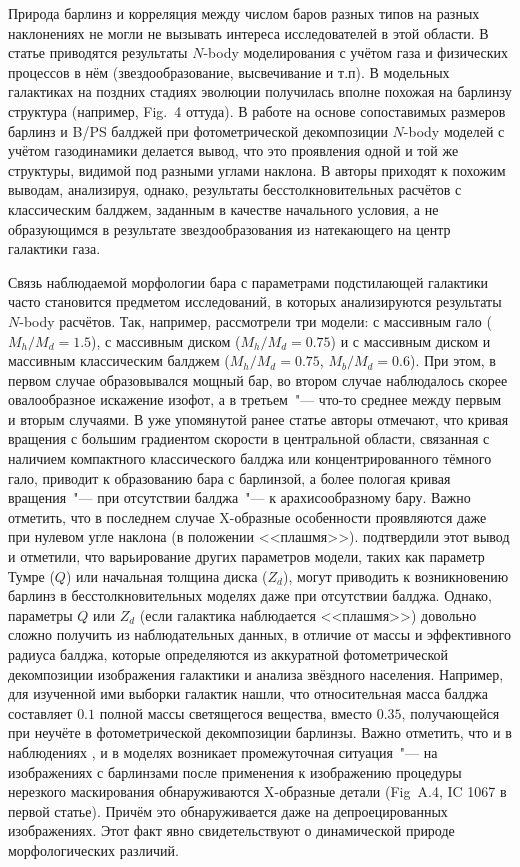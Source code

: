 \documentclass{trlnotes}
\begin{document}
Природа барлинз и корреляция между числом баров разных типов на разных наклонениях не могли не вызывать интереса исследователей в этой области.  В статье \citet{athanassoula2013a} приводятся результаты $N$-body моделирования с учётом газа и физических процессов в нём (звездообразование, высвечивание и т.п). В модельных галактиках на поздних стадиях эволюции  получилась вполне похожая на барлинзу структура (например, Fig.~4 оттуда). В работе  \citet{athanassoula2015} на основе сопоставимых размеров барлинз и B/PS балджей при фотометрической декомпозиции $N$-body моделей с учётом газодинамики делается вывод, что это проявления одной и той же структуры, видимой под разными углами наклона. В \citet{salo2017} авторы приходят к похожим выводам, анализируя, однако, результаты бесстолкновительных расчётов с классическим балджем, заданным в качестве начального условия, а не образующимся в результате звездообразования из  натекающего на центр галактики газа. 

Связь наблюдаемой морфологии бара с параметрами подстилающей галактики часто становится предметом исследований, в которых анализируются результаты $N$-body расчётов. Так, например, \citet{athanassoula2002} рассмотрели три модели: с массивным гало ($M_h/M_d = 1.5$), с массивным диском ($M_h/M_d = 0.75$) и с массивным диском и массивным классическим балджем ($M_h/M_d = 0.75$, $M_b/M_d = 0.6$). При этом, в первом случае образовывался мощный  бар, во втором случае наблюдалось скорее овалообразное искажение изофот, а в третьем~"--- что-то среднее между первым и вторым случаями. В уже упомянутой ранее статье \citet{salo2017} авторы отмечают, что кривая вращения с большим градиентом скорости в центральной области, связанная с наличием компактного классического балджа или концентрированного тёмного гало, приводит к образованию бара с барлинзой, а более пологая кривая вращения~"--- при отсутствии балджа~"--- к арахисообразному бару. Важно отметить, что в последнем случае X-образные особенности проявляются даже при нулевом угле наклона (в положении <<плашмя>>). \citet{smirnov2018} подтвердили этот вывод и отметили, что варьирование других параметров модели, таких как параметр Тумре ($Q$) или начальная толщина диска ($Z_d$), могут приводить к возникновению барлинз в бесстолкновительных моделях даже при отсутствии балджа. Однако, параметры $Q$ или $Z_d$ (если галактика наблюдается <<плашмя>>) довольно сложно получить из наблюдательных данных, в отличие от массы и эффективного радиуса балджа, которые определяются из аккуратной фотометрической декомпозиции изображения галактики и анализа звёздного населения. Например, \citet{laurikainen2014} для изученной ими выборки галактик нашли, что относительная масса балджа составляет $0.1$ полной массы светящегося вещества, вместо $0.35$, получающейся при неучёте в фотометрической декомпозиции барлинзы. Важно отметить, что и в наблюдениях \citep{laurikainen2017}, и в моделях \citep{salo2017} возникает промежуточная ситуация~"--- на изображениях с барлинзами после применения к изображению процедуры нерезкого маскирования обнаруживаются X-образные детали (Fig~A.4, IC 1067 в первой статье). Причём это обнаруживается даже на депроецированных изображениях. Этот факт явно свидетельствуют о динамической природе морфологических различий. 
\end{document}
